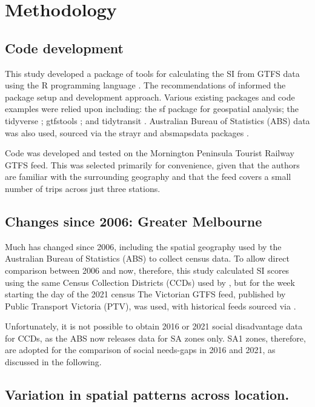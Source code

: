 \documentclass[preprint, 3p,
authoryear]{elsarticle} %
\begin{document}
\section{Methodology}\label{methodology}

\subsection{Code development}\label{code-development}

This study developed a package of tools for calculating the SI from GTFS
data using the R programming language \citep{R-base}. The
recommendations of \citet{wickham2023r} informed the package setup and
development approach. Various existing packages and code examples were
relied upon including: the sf package \citep{R-sf} for geospatial
analysis; the tidyverse \citep{tidyverse2019}; gtfstools
\citep{R-gtfstools}; and tidytransit \citep{R-tidytransit}. Australian
Bureau of Statistics (ABS) data was also used, sourced via the strayr
and absmapsdata packages \citep{r-strayr}.

Code was developed and tested on the Mornington Peninsula Tourist
Railway GTFS feed. This was selected primarily for convenience, given
that the authors are familiar with the surrounding geography and that
the feed covers a small number of trips across just three stations.

\subsection{Changes since 2006: Greater
Melbourne}\label{changes-since-2006-greater-melbourne}

Much has changed since 2006, including the spatial geography used by the
Australian Bureau of Statistics (ABS) to collect census data. To allow
direct comparison between 2006 and now, therefore, this study calculated
SI scores using the same Census Collection Districts (CCDs) used by
\citet{currie2010identifying}, but for the week starting the day of the
2021 census The Victorian GTFS feed, published by Public Transport
Victoria (PTV), was used, with historical feeds sourced via
\citet{transitfeeds_victoria:2023aa}.

Unfortunately, it is not possible to obtain 2016 or 2021 social
disadvantage data for CCDs, as the ABS now releases data for SA zones
only. SA1 zones, therefore, are adopted for the comparison of social
needs-gaps in 2016 and 2021, as discussed in the following.

\subsection{Variation in spatial patterns across
location.}\label{variation-in-spatial-patterns-across-location.}
\end{document}
